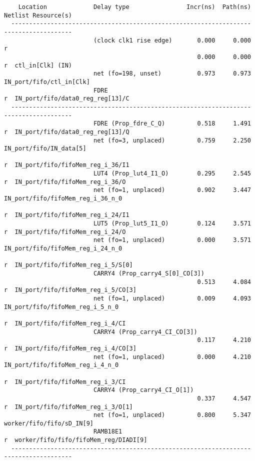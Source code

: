 \begin{lstlisting}
    Location             Delay type                Incr(ns)  Path(ns)    Netlist Resource(s)
  -------------------------------------------------------------------    -------------------
                         (clock clk1 rise edge)       0.000     0.000 r
                                                      0.000     0.000 r  ctl_in[Clk] (IN)
                         net (fo=198, unset)          0.973     0.973    IN_port/fifo/ctl_in[Clk]
                         FDRE                                         r  IN_port/fifo/data0_reg_reg[13]/C
  -------------------------------------------------------------------    -------------------
                         FDRE (Prop_fdre_C_Q)         0.518     1.491 r  IN_port/fifo/data0_reg_reg[13]/Q
                         net (fo=3, unplaced)         0.759     2.250    IN_port/fifo/IN_data[5]
                                                                      r  IN_port/fifo/fifoMem_reg_i_36/I1
                         LUT4 (Prop_lut4_I1_O)        0.295     2.545 r  IN_port/fifo/fifoMem_reg_i_36/O
                         net (fo=1, unplaced)         0.902     3.447    IN_port/fifo/fifoMem_reg_i_36_n_0
                                                                      r  IN_port/fifo/fifoMem_reg_i_24/I1
                         LUT5 (Prop_lut5_I1_O)        0.124     3.571 r  IN_port/fifo/fifoMem_reg_i_24/O
                         net (fo=1, unplaced)         0.000     3.571    IN_port/fifo/fifoMem_reg_i_24_n_0
                                                                      r  IN_port/fifo/fifoMem_reg_i_5/S[0]
                         CARRY4 (Prop_carry4_S[0]_CO[3])
                                                      0.513     4.084 r  IN_port/fifo/fifoMem_reg_i_5/CO[3]
                         net (fo=1, unplaced)         0.009     4.093    IN_port/fifo/fifoMem_reg_i_5_n_0
                                                                      r  IN_port/fifo/fifoMem_reg_i_4/CI
                         CARRY4 (Prop_carry4_CI_CO[3])
                                                      0.117     4.210 r  IN_port/fifo/fifoMem_reg_i_4/CO[3]
                         net (fo=1, unplaced)         0.000     4.210    IN_port/fifo/fifoMem_reg_i_4_n_0
                                                                      r  IN_port/fifo/fifoMem_reg_i_3/CI
                         CARRY4 (Prop_carry4_CI_O[1])
                                                      0.337     4.547 r  IN_port/fifo/fifoMem_reg_i_3/O[1]
                         net (fo=1, unplaced)         0.800     5.347    worker/fifo/fifo/sD_IN[9]
                         RAMB18E1                                     r  worker/fifo/fifo/fifoMem_reg/DIADI[9]
  -------------------------------------------------------------------    -------------------


\end{lstlisting}
